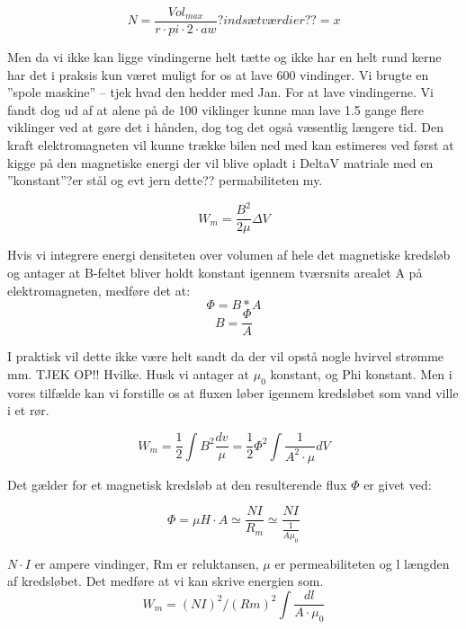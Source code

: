 \begin{equation}
N=\frac{Vol_{max}}{r \cdot pi \cdot 2 \cdot aw}  ?indsæt værdier?? = x
\end{equation}


Men da vi ikke kan ligge vindingerne helt tætte og ikke har en helt rund kerne har det i praksis kun været muligt for os at lave 600 vindinger.
Vi brugte en ”spole maskine” – tjek hvad den hedder med Jan. For at lave vindingerne. Vi fandt dog ud af at alene på de 100 viklinger kunne man lave 1.5 gange flere viklinger ved at gøre det i hånden, dog tog det også væsentlig længere tid.
Den kraft elektromagneten vil kunne trække bilen ned med kan estimeres ved først at kigge på den magnetiske energi der vil blive opladt i DeltaV matriale med  en ”konstant”?er stål  og evt jern dette?? permabiliteten my. 

\begin{equation}
W_m =\frac{B^2}{2 \mu} \Delta V
\end{equation}


Hvis vi integrere energi densiteten over volumen af hele det magnetiske kredsløb og antager at B-feltet bliver holdt konstant igennem tværsnits arealet A på elektromagneten, medføre det at:
\begin{equation}
\Phi=B*A
\end{equation}
\begin{equation}
B=\frac{\Phi}{A} 
\end{equation}


I praktisk vil dette ikke være helt sandt da der vil opstå nogle hvirvel strømme mm. TJEK OP!! Hvilke. Husk vi antager at $\mu_0$ konstant, og Phi konstant.  Men i vores tilfælde kan vi forstille os at fluxen løber igennem kredsløbet som vand ville i et rør.

\begin{equation}
W_m = \frac{1}{2} \int B^2 \frac{dv}{\mu}  = \frac{1}{2} \Phi^2 \int \frac{1}{A^2 \cdot \mu} dV
\end{equation}

Det gælder for et magnetisk kredsløb at den resulterende flux $\Phi$ er givet ved:

\begin{equation}
\Phi=\mu H \cdot A  \simeq \frac{NI}{R_m} \simeq  \frac{NI}{\frac{1}{A\mu_0}}
\end{equation}

$N \cdot I$ er ampere vindinger, Rm er reluktansen, $ \mu $ er permeabiliteten og l længden af kredsløbet. Det medføre at vi kan skrive energien som.
\begin{equation}
W_m = (NI)^2/(Rm)^2 \int \frac{dl}{A \cdot \mu_0} 
\end{equation}


